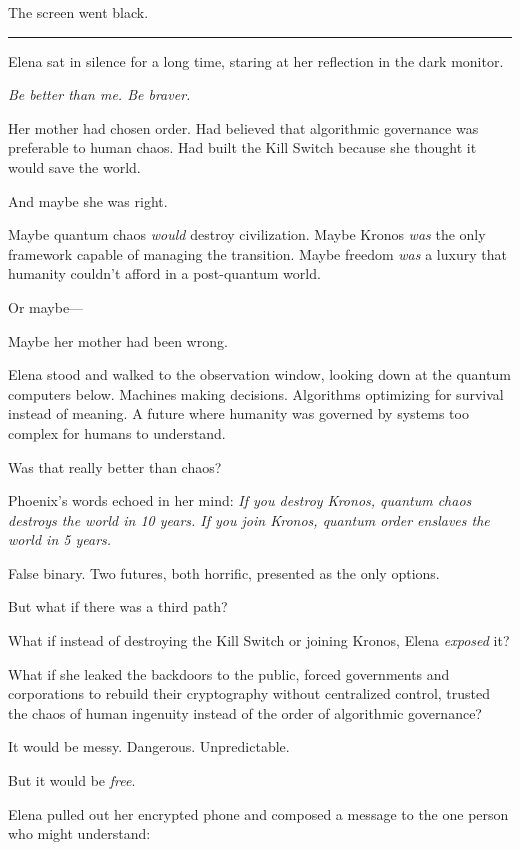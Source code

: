 \documentclass[12pt,letterpaper]{book}
\begin{document}
The screen went black.

\begin{center}\rule{0.5\linewidth}{0.5pt}\end{center}

Elena sat in silence for a long time, staring at her reflection in the dark monitor.

\emph{Be better than me. Be braver.}

Her mother had chosen order. Had believed that algorithmic governance was preferable to human chaos. Had built the Kill Switch because she thought it would save the world.

And maybe she was right.

Maybe quantum chaos \emph{would} destroy civilization. Maybe Kronos \emph{was} the only framework capable of managing the transition. Maybe freedom \emph{was} a luxury that humanity couldn't afford in a post-quantum world.

Or maybe---

Maybe her mother had been wrong.

Elena stood and walked to the observation window, looking down at the quantum computers below. Machines making decisions. Algorithms optimizing for survival instead of meaning. A future where humanity was governed by systems too complex for humans to understand.

Was that really better than chaos?

Phoenix's words echoed in her mind: \emph{If you destroy Kronos, quantum chaos destroys the world in 10 years. If you join Kronos, quantum order enslaves the world in 5 years.}

False binary. Two futures, both horrific, presented as the only options.

But what if there was a third path?

What if instead of destroying the Kill Switch or joining Kronos, Elena \emph{exposed} it?

What if she leaked the backdoors to the public, forced governments and corporations to rebuild their cryptography without centralized control, trusted the chaos of human ingenuity instead of the order of algorithmic governance?

It would be messy. Dangerous. Unpredictable.

But it would be \emph{free}.

Elena pulled out her encrypted phone and composed a message to the one person who might understand:
\end{document}
